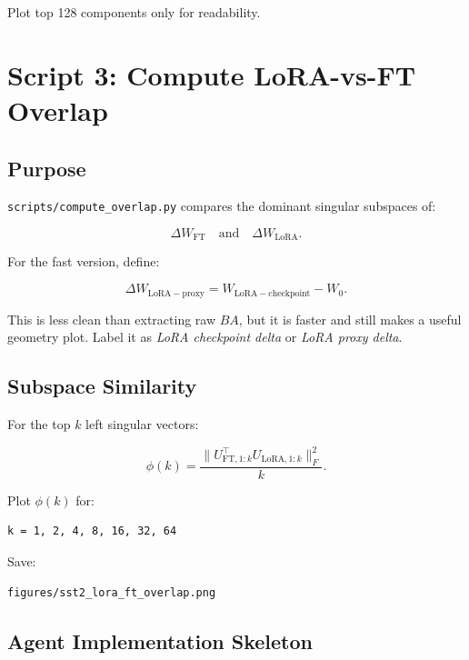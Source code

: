 \documentclass[11pt]{article}
\begin{document}
Plot top 128 components only for readability.

\section{Script 3: Compute LoRA-vs-FT Overlap}

\subsection{Purpose}

\texttt{scripts/compute\_overlap.py} compares the dominant singular subspaces of:

\[
\Delta W_{\mathrm{FT}}
\quad \text{and} \quad
\Delta W_{\mathrm{LoRA}}.
\]

For the fast version, define:

\[
\Delta W_{\mathrm{LoRA-proxy}} = W_{\mathrm{LoRA-checkpoint}} - W_0.
\]

This is less clean than extracting raw \(BA\), but it is faster and still makes a useful geometry plot. Label it as \emph{LoRA checkpoint delta} or \emph{LoRA proxy delta}.

\subsection{Subspace Similarity}

For the top \(k\) left singular vectors:

\[
\phi(k) =
\frac{\|U_{\mathrm{FT},1:k}^{\top} U_{\mathrm{LoRA},1:k}\|_F^2}{k}.
\]

Plot \(\phi(k)\) for:

\begin{lstlisting}
k = 1, 2, 4, 8, 16, 32, 64
\end{lstlisting}

Save:

\begin{lstlisting}
figures/sst2_lora_ft_overlap.png
\end{lstlisting}

\subsection{Agent Implementation Skeleton}
\end{document}
